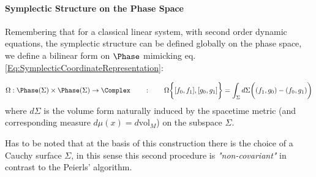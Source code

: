 \documentclass[Main]{subfiles}
\begin{document}
		\paragraph{Symplectic Structure on the Phase Space}
			Remembering that for a classical linear system, with second order dynamic equations, the symplectic structure can be defined globally on the phase space, we define a bilinear form on $\Phase$ mimicking eq. \ref{Eq:SymplecticCoordinateRepresentation}:
			\begin{definition}\label{Def:InitialDataSymplecticForm}
				\begin{displaymath}
					\Omega: \Phase(\Sigma) \times \Phase(\Sigma) \rightarrow \Complex \qquad : \qquad 					
					\Omega \biggr\{ [f_0,f_1] , [g_0, g_1] \biggr\} = \int_\Sigma d\Sigma \biggr( (f_1,g_0)  - ( f_0, g_1) \biggr)
				\end{displaymath}
				where $d\Sigma$ is the volume form naturally induced by the spacetime metric (and corresponding measure $d\mu(x)= d\textrm{vol}_M$) on the subspace $\Sigma$.
			\end{definition}			
			
			Has to be noted that at the basis of this construction there is the choice of a Cauchy surface $\Sigma$, in this sense this second procedure is \emph{"non-covariant"} in contrast to the Peierls' algorithm.
				
\end{document}
